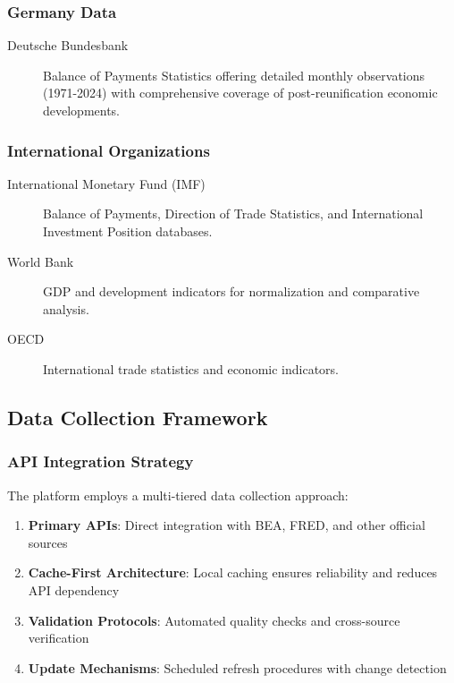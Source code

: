 \documentclass[11pt,a4paper]{article}
\begin{document}
\subsubsection{Germany Data}
\begin{description}
    \item[Deutsche Bundesbank] Balance of Payments Statistics offering detailed monthly observations (1971-2024) with comprehensive coverage of post-reunification economic developments.
\end{description}

\subsubsection{International Organizations}
\begin{description}
    \item[International Monetary Fund (IMF)] Balance of Payments, Direction of Trade Statistics, and International Investment Position databases.
    \item[World Bank] GDP and development indicators for normalization and comparative analysis.
    \item[OECD] International trade statistics and economic indicators.
\end{description}

\subsection{Data Collection Framework}

\subsubsection{API Integration Strategy}
The platform employs a multi-tiered data collection approach:

\begin{enumerate}
    \item \textbf{Primary APIs}: Direct integration with BEA, FRED, and other official sources
    \item \textbf{Cache-First Architecture}: Local caching ensures reliability and reduces API dependency
    \item \textbf{Validation Protocols}: Automated quality checks and cross-source verification
    \item \textbf{Update Mechanisms}: Scheduled refresh procedures with change detection
\end{enumerate}
\end{document}

